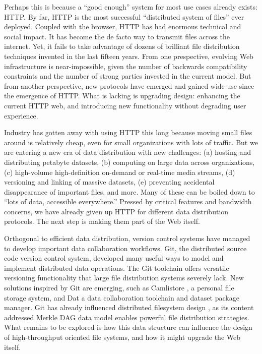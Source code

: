 \documentclass{sig-alternate}
\begin{document}
Perhaps this is because a ``good enough'' system for most use cases already exists: HTTP.  By far, HTTP is the most successful ``distributed system of files'' ever deployed. Coupled with the browser, HTTP has had enormous technical and social impact. It has become the de facto way to transmit files across the internet. Yet, it fails to take advantage of dozens of brilliant file distribution techniques invented in the last fifteen years. From one prespective, evolving Web infrastructure is near-impossible, given the number of backwards compatibility constraints and the number of strong parties invested in the current model. But from another perspective, new protocols have emerged and gained wide use since the emergence of HTTP. What is lacking is upgrading design: enhancing the current HTTP web, and introducing new functionality without degrading user experience.

Industry has gotten away with using HTTP this long because moving small files around is relatively cheap, even for small organizations with lots of traffic. But we are entering a new era of data distribution with new challenges: (a) hosting and distributing petabyte datasets, (b) computing on large data across organizations, (c) high-volume high-definition on-demand or real-time media streams, (d) versioning and linking of massive datasets, (e) preventing accidental disappearance of important files, and more. Many of these can be boiled down to ``lots of data, accessible everywhere.'' Pressed by critical features and bandwidth concerns, we have already given up HTTP for different data distribution protocols. The next step is making them part of the Web itself.

Orthogonal to efficient data distribution, version control systems have managed to develop important data collaboration workflows. Git, the distributed source code version control system, developed many useful ways to model and implement distributed data operations. The Git toolchain offers versatile versioning functionality that large file distribution systems severely lack. New solutions inspired by Git are emerging, such as Camlistore \cite{Camlistore}, a personal file storage system, and Dat \cite{Dat} a data collaboration toolchain and dataset package manager. Git has already influenced distributed filesystem design \cite{Ori}, as its content addressed Merkle DAG data model enables powerful file distribution strategies. What remains to be explored is how this data structure can influence the design of high-throughput oriented file systems, and how it might upgrade the Web itself.
\end{document}
